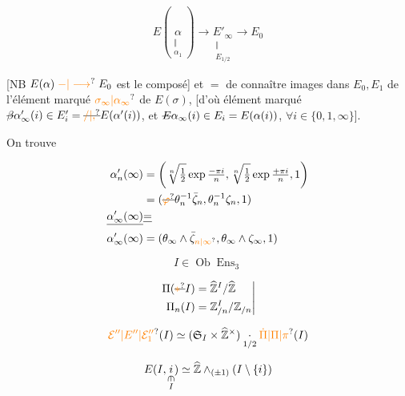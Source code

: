 \[
E(\underset{\substack{\Vert\\\alpha_1}}{\alpha})\longrightarrow
\underset{\substack{\Vert\\E_{1/2}}}{E'_\infty}\longrightarrow E_0
\]

[NB $E(\alpha)\mathrel{\unsure{-|\longrightarrow}}E_0$ est le composé] et $=$ de connaître  images dans $E_0,E_1$ de l'élément marqué $\unsure{\sigma_\infty|\alpha_\infty}$ de $E(\sigma)$, [d'où élément marqué $\deleted{\beta}\alpha'_\infty(i)\in E'_i=\deleted{\unsure{/|,}}E(\alpha'(i))$, et $\deleted{E}\alpha_\infty(i)\in E_i=E(\alpha(i))$, $\forall i\in\{0,1,\infty\}$].

On trouve

\[
\begin{aligned}
\alpha'_n(\infty)&=\left(\sqrt[n]{\tfrac12}\exp\tfrac{-\pi i}{n},\sqrt[n]{\tfrac12}\exp\tfrac{+\pi i}{n},1\right)\\
&=(\deleted{\unsure{\varphi}}\theta_n^{-1}\bar\zeta_n,\theta_n^{-1}\zeta_n,1)\\
\deleted{\alpha'_\infty(\infty)}&\deleted{=}\\[-.6ex]
\alpha'_\infty(\infty)&=(\theta_\infty\wedge\bar\zeta_{\unsure{n|\infty}},\theta_\infty\wedge\zeta_\infty,1)
\end{aligned}
\]


\[
I\in\operatorname{Ob}\operatorname{Ens}_3
\]

\[
\left.\begin{aligned}
\Pi(\deleted{\unsure{*}}I)&=\widehat{\mathbb Z}^{I}/\widehat{\mathbb Z}\\
\Pi_n(I)&=\mathbb Z_{/n}^{I}/\mathbb Z_{/n}
\end{aligned}\right|
\]


\[
\unsure{\mathcal E''|E''|\mathcal E''_1}(I)\simeq(\mathfrak S_I\times\widehat{\mathbb Z}^{\times})\underset{1/2}{\cdot}\unsure{\dot\Pi|\Pi|\pi}(I)
\]

\[
E(I,\underset{\substack{\rotatebox{-90}{$\in$}\\I}}{i})\simeq\widehat{\mathbb Z}\wedge_{(\pm1)}(I\setminus\{i\})
\]

